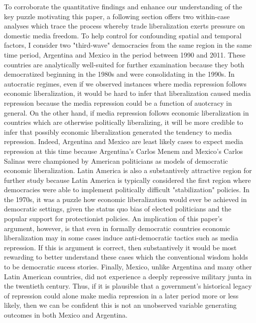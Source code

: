 \documentclass[12pt,a4paper]{article}\usepackage[]{graphicx}\usepackage[]{color}
\begin{document}
To corroborate the quantitative findings and enhance our understanding of the key puzzle motivating this paper, a following section offers two within-case analyses which trace the process whereby trade liberalization exerts pressure on domestic media freedom. To help control for confounding spatial and temporal factors, I consider two "third-wave" democracies from the same region in the same time period, Argentina and Mexico in the period between 1990 and 2011. These countries are analytically well-suited for further examination because they both democratized beginning in the 1980s and were consolidating in the 1990s. In autocratic regimes, even if we observed instances where media repression follows economic liberalization, it would be hard to infer that liberalization caused media repression because the media repression could be a function of auotcracy in general. On the other hand, if media repression follows economic liberalization in countries which are otherwise politically liberalizing, it will be more credible to infer that possibly economic liberalization generated the tendency to media repression. Indeed, Argentina and Mexico are least likely cases to expect media repression at this time because Argentina's Carlos Menem and Mexico's Carlos Salinas were championed by American politicians as models of democratic economic liberalization. Latin America is also a substantively attractive region for further study because Latin America is typically considered the first region where democracies were able to implement politically difficult "stabilization" policies. In the 1970s, it was a puzzle how economic liberalization would ever be achieved in democratic settings, given the status quo bias of elected politicians and the popular support for protectionist policies. An implication of this paper's argument, however, is that even in formally democratic countries economic liberalization may in some cases induce anti-democratic tactics such as media repression. If this is argument is correct, then substantively it would be most rewarding to better understand these cases which the conventional wisdom holds to be democratic sucess stories. Finally, Mexico, unlike Argentina and many other Latin American countries, did not experience a deeply repressive military junta in the twentieth century. Thus, if it is plausible that a government's historical legacy of repression could alone make media repression in a later period more or less likely, then we can be confident this is not an unobserved variable generating outcomes in both Mexico and Argentina.
\end{document}
